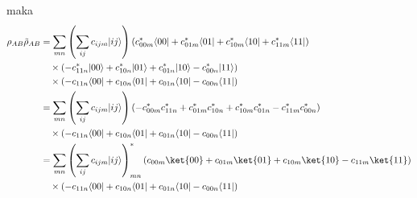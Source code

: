 maka
\begin{equation}
	\begin{aligned}
		\rho_{AB} \tilde{\rho}_{AB}
		&= \sum_{m n}
		\left(
		\sum_{i j} c_{i j m} | i j \rangle
		\right)
		\left(
		c^{*}_{00m} \langle 00|
		+ c^{*}_{01m} \langle 01|
		+ c^{*}_{10m} \langle 10|
		+ c^{*}_{11m} \langle 11|
		\right) \\
		&\quad \times
		\left(
		- c^{*}_{11n} |00\rangle
		+ c^{*}_{10n} |01\rangle
		+ c^{*}_{01n} |10\rangle
		- c^{*}_{00n} |11\rangle
		\right) \\
		&\quad \times
		\left(
		- c_{11n} \langle 00|
		+ c_{10n} \langle 01|
		+ c_{01n} \langle 10|
		- c_{00n} \langle 11|
		\right)\\
		&= \sum_{m n}
		\left(
		\sum_{i j} c_{i j m} | i j \rangle
		\right)
		\left(
		- c^{*}_{00m} c^{*}_{11n}
		+ c^{*}_{01m} c^{*}_{10n}
		+ c^{*}_{10m} c^{*}_{01n}
		- c^{*}_{11m} c^{*}_{00n}
		\right) \\
		&\quad \times
		\left(
		- c_{11n} \langle 00|
		+ c_{10n} \langle 01|
		+ c_{01n} \langle 10|
		- c_{00n} \langle 11|
		\right)\\
		&= \sum_{m n}
		\left(
		\sum_{i j} c_{i j m} | i j \rangle
		\right)^{*}_{mn}
		\left(
		c_{00m} \ket{00}
		+ c_{01m} \ket{01}
		+ c_{10m} \ket{10}
		- c_{11m} \ket{11}
		\right) \\
		&\quad \times
		\left(
		- c_{11n} \langle 00|
		+ c_{10n} \langle 01|
		+ c_{01n} \langle 10|
		- c_{00n} \langle 11|
		\right)
	\end{aligned}
\end{equation}

